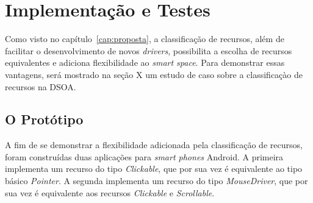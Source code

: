 \chapter{Implementação e Testes}

Como visto no capítulo~\ref{cap:proposta}, a classificação de recursos, além de facilitar o desenvolvimento de novos \emph{drivers}, possibilita a escolha de recursos equivalentes e adiciona flexibilidade ao \emph{smart space}. Para demonstrar essas vantagens, será mostrado na seção X um estudo de caso sobre a classificaçào de recursos na DSOA.

\section{O Protótipo}
A fim de se demonstrar a flexibilidade adicionada pela classificação de recursos, foram construídas duas aplicações para \emph{smart phones} Android. A primeira implementa um recurso do tipo \emph{Clickable}, que por sua vez é equivalente ao tipo básico \emph{Pointer}. A segunda implementa um recurso do tipo \emph{MouseDriver}, que por sua vez é equivalente aos recursos \emph{Clickable} e \emph{Scrollable}.